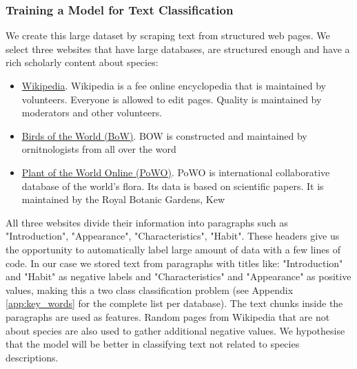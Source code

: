 \documentclass[a4paper, 12pt, oneside]{book} %
\begin{document}
\subsubsection{Training a Model for Text Classification} \label{par:reedloss}
We create this large dataset by scraping text from structured web pages.
We select three websites that have large databases, are structured enough and have a rich scholarly content about species:
\begin{itemize}
    \item \href{www.wikipedia.com}{Wikipedia}. Wikipedia is a fee online encyclopedia that is maintained by volunteers. Everyone is allowed to edit pages. Quality is maintained by moderators and other volunteers.
    \item \href{https://birdsoftheworld.org/bow/home}{Birds of the World (BoW)}. BOW is constructed and maintained by ornitnologists from all over the word \autocite{billerman_birds_2020}
    \item \href{https://powo.science.kew.org/}{Plant of the World Online (PoWO)}. PoWO is international collaborative database of the world's flora. Its data is based on scientific papers. It is maintained by the Royal Botanic Gardens, Kew  \autocite{facilitated_by_the_royal_botanic_gardens_plants_2019}
\end{itemize}
All three websites divide their information into paragraphs such as "Introduction", "Appearance", "Characteristics", "Habit".
These headers give us the opportunity to automatically label large amount of data with a few lines of code.
In our case we stored text from paragraphs with titles like:  "Introduction" and "Habit" as negative labels and "Characteristics" and "Appearance" as positive values, making this a two class classification problem (see Appendix \ref{app:key_words} for the complete list per database).
The text chunks inside the paragraphs are used as features.
Random pages from Wikipedia that are not about species are also used to gather additional negative values.
We hypothesise that the model will be better in classifying text not related to species descriptions.

\end{document}
